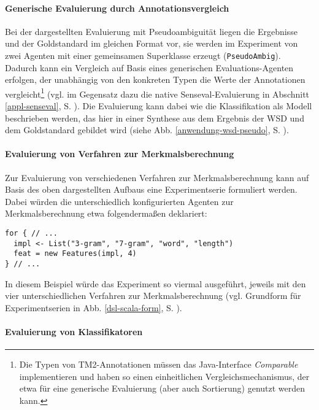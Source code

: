 \documentclass[abstracton, 12pt]{scrartcl}
\begin{document}
\paragraph{Generische Evaluierung durch Annotationsvergleich}

Bei der dargestellten Evaluierung mit Pseudoambiguität liegen die Ergebnisse und der Goldstandard im gleichen Format vor, sie werden im Experiment von zwei Agenten mit einer gemeinsamen Superklasse erzeugt (\lstinline!PseudoAmbig!). Dadurch kann ein Vergleich auf Basis eines generischen Evaluations-Agenten erfolgen, der unabhängig von den konkreten Typen die Werte der Annotationen vergleicht\footnote{Die Typen von TM2-Annotationen müssen das Java-Interface \emph{Comparable} implementieren und haben so einen einheitlichen Vergleichsmechanismus, der etwa für eine generische Evaluierung (aber auch Sortierung) genutzt werden kann.} (vgl. im Gegensatz dazu die native Senseval-Evaluierung in Abschnitt \ref{appl-senseval}, S. \pageref{appl-senseval}). Die Evaluierung kann dabei wie die Klassifikation als Modell beschrieben werden, das hier in einer Synthese aus dem Ergebnis der WSD und dem Goldstandard gebildet wird (siehe Abb. \ref{anwendung-wsd-pseudo}, S. \pageref{anwendung-wsd-pseudo}).

\paragraph{Evaluierung von Verfahren zur Merkmalsberechnung}

Zur Evaluierung von verschiedenen Verfahren zur Merkmalsberechnung kann auf Basis des oben dargestellten Aufbaus eine Experimentserie formuliert werden. Dabei würden die unterschiedlich konfigurierten Agenten zur Merkmalsberechnung etwa folgendermaßen deklariert:

\begin{lstlisting}
for { // ...
  impl <- List("3-gram", "7-gram", "word", "length")
  feat = new Features(impl, 4)
} // ...
\end{lstlisting}

In diesem Beispiel würde das Experiment so viermal ausgeführt, jeweils mit den vier unterschiedlichen Verfahren zur Merkmalsberechnung (vgl. Grundform für Experimentserien in Abb. \ref{dsl-scala-form}, S. \pageref{dsl-scala-form}).

\paragraph{Evaluierung von Klassifikatoren}
\end{document}
